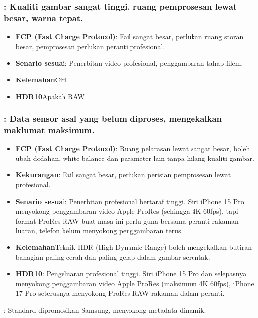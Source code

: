 \subsubsection*{: Kualiti gambar sangat tinggi, ruang pemprosesan lewat besar, warna tepat.}

\begin{itemize}
  \item \textbf{FCP (Fast Charge Protocol)}: Fail sangat besar, perlukan ruang storan besar, pemprosesan perlukan peranti profesional.
  \item \textbf{Senario sesuai}: Penerbitan video profesional, penggambaran tahap filem.
  \item \textbf{Kelemahan}Ciri
  \item \textbf{HDR10}Apakah RAW
\end{itemize}

\subsubsection*{: Data sensor asal yang belum diproses, mengekalkan maklumat maksimum.}

\begin{itemize}
  \item \textbf{FCP (Fast Charge Protocol)}: Ruang pelarasan lewat sangat besar, boleh ubah dedahan, white balance dan parameter lain tanpa hilang kualiti gambar.
  \item \textbf{Kekurangan}: Fail sangat besar, perlukan perisian pemprosesan lewat profesional.
  \item \textbf{Senario sesuai}: Penerbitan profesional bertaraf tinggi. Siri iPhone 15 Pro menyokong penggambaran video Apple ProRes (sehingga 4K 60fps), tapi format ProRes RAW buat masa ini perlu guna bersama peranti rakaman luaran, telefon belum menyokong penggambaran terus.
  \item \textbf{Kelemahan}Teknik HDR (High Dynamic Range) boleh mengekalkan butiran bahagian paling cerah dan paling gelap dalam gambar serentak.
  \item \textbf{HDR10}: Pengeluaran profesional tinggi. Siri iPhone 15 Pro dan selepasnya menyokong penggambaran video Apple ProRes (maksimum 4K 60fps), iPhone 17 Pro seterusnya menyokong ProRes RAW rakaman dalam peranti.
\end{itemize}


: Standard dipromosikan Samsung, menyokong metadata dinamik.

